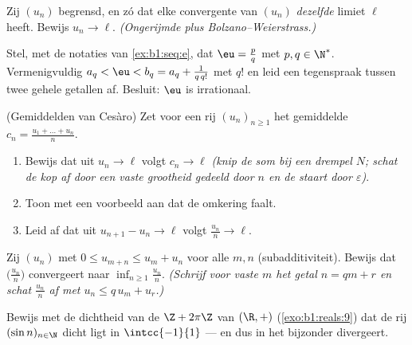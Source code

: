 \begin{exercise}[$\star\star$]\label{exo:b1:seq:8}
Zij $(u_n)$ begrensd, en zó dat elke convergente  van $(u_n)$
\emph{dezelfde} limiet $\ell$ heeft. Bewijs $u_n \to \ell$.
\emph{(Ongerijmde plus Bolzano--Weierstrass.)}
\end{exercise}

\begin{exercise}[$\star\star\star$]\label{exo:b1:seq:9}
Stel, met de notaties van \cref{ex:b1:seq:e}, dat $\eu = \frac pq$ met
$p, q \in \N^*$. Vermenigvuldig $a_q < \eu < b_q = a_q + \frac{1}{q\,
q!}$ met $q!$ en leid een tegenspraak tussen twee gehele getallen af.
Besluit: $\eu$ is irrationaal.
\end{exercise}

\begin{exercise}[$\star\star\star$]\label{exo:b1:seq:10}
(Gemiddelden van Cesàro) Zet voor een rij $(u_n)_{n \geq 1}$ het
gemiddelde $c_n = \frac{u_1 + \dots + u_n}{n}$.
\begin{enumerate}
  \item Bewijs dat uit $u_n \to \ell$ volgt $c_n \to \ell$ \emph{(knip de
        som bij een drempel $N$; schat de kop af door een vaste
        grootheid gedeeld door $n$ en de staart door $\varepsilon$)}.
  \item Toon met een voorbeeld aan dat de omkering faalt.
  \item Leid af dat uit $u_{n+1} - u_n \to \ell$ volgt $\frac{u_n}{n} \to
        \ell$.
\end{enumerate}
\end{exercise}

\begin{exercise}[$\star\star\star$]\label{exo:b1:seq:11}
Zij $(u_n)$ met $0 \leq u_{m+n} \leq u_m + u_n$ voor alle $m, n$
(subadditiviteit). Bewijs dat $\bigl(\frac{u_n}{n}\bigr)$ convergeert
naar $\inf_{n \geq 1} \frac{u_n}{n}$. \emph{(Schrijf voor vaste $m$ het
getal $n = qm + r$ en schat $\frac{u_n}{n}$ af met $u_n \leq q\,u_m +
u_r$.)}
\end{exercise}

\begin{exercise}[$\star\star\star$]\label{exo:b1:seq:12}
Bewijs met de dichtheid van de  $\Z + 2\pi\Z$ van $(\R, +)$
(\cref{exo:b1:reals:9}) dat de rij $(\sin n)_{n \in \N}$ dicht ligt in
$\intcc{-1}{1}$ --- en dus in het bijzonder divergeert.
\end{exercise}

